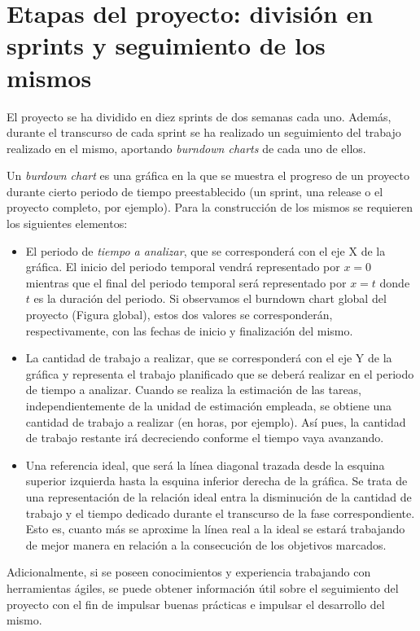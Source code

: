 \chapter{Etapas del proyecto: división en sprints y seguimiento de los mismos}\label{chapter:sprints}

El proyecto se ha dividido en diez sprints de dos semanas cada uno. Además, durante el transcurso de cada sprint se ha realizado un seguimiento del trabajo realizado en el mismo, aportando \emph{burndown charts} de cada uno de ellos.

Un \emph{burdown chart} es una gráfica en la que se muestra el progreso de un proyecto durante cierto periodo de tiempo preestablecido (un sprint, una release o el proyecto completo, por ejemplo). Para la construcción de los mismos se requieren los siguientes elementos:
\begin{itemize}
\item El periodo de \emph{tiempo a analizar}, que se corresponderá con el eje X de la gráfica. El inicio del periodo temporal vendrá representado por $x = 0$ mientras que el final del periodo temporal será representado por $x = t$ donde $t$ es la duración del periodo. Si observamos el burndown chart global del proyecto (Figura global), estos dos valores se corresponderán, respectivamente, con las fechas de inicio y finalización del mismo.
\item La cantidad de trabajo a realizar, que se corresponderá con el eje Y de la gráfica y representa el trabajo planificado que se deberá realizar en el periodo de tiempo a analizar. Cuando se realiza la estimación de las tareas, independientemente de la unidad de estimación empleada, se obtiene una cantidad de trabajo a realizar (en horas, por ejemplo). Así pues, la cantidad de trabajo restante irá decreciendo conforme el tiempo vaya avanzando.
\item Una referencia ideal, que será la línea diagonal trazada desde la esquina superior izquierda hasta la esquina inferior derecha de la gráfica. Se trata de una representación de la relación ideal entra la disminución de la cantidad de trabajo y el tiempo dedicado durante el transcurso de la fase correspondiente. Esto es, cuanto más se aproxime la línea real a la ideal se estará trabajando de mejor manera en relación a la consecución de los objetivos marcados.
\end{itemize}

Adicionalmente, si se poseen conocimientos y experiencia trabajando con herramientas ágiles, se puede obtener información útil sobre el seguimiento del proyecto con el fin de impulsar buenas prácticas e impulsar el desarrollo del mismo.


